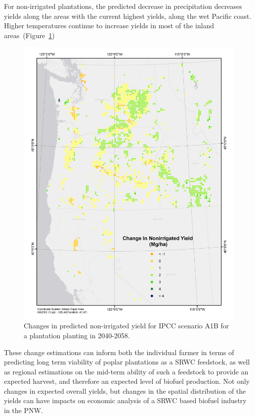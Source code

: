 \documentclass[preprint,review,12pt]{elsarticle}
\begin{document}
For non-irrigated plantations, the predicted decrease in precipitation
decreases yields along the areas with the current highest yields,
along the wet Pacific coast.  Higher temperatures continue to increase
yields in most of the inland areas~(Figure~\ref{fig:new_nonirrigated})

\begin{figure}[hp]
  \centering
  \includegraphics[width=1\linewidth]{climate_nonirrigated}
  \caption{Changes in predicted non-irrigated yield for \ac{IPCC} scenario A1B
    for a plantation planting in 2040-2058.}
  \label{fig:new_nonirrigated}
\end{figure}

These change estimations can inform both the individual farmer in terms of
predicting long term viability of poplar plantations as a \ac{SRWC}
feedstock, as well as regional estimations on the mid-term ability of
such a feedstock to provide an expected harvest, and therefore an
expected level of biofuel production.  Not only changes in expected
overall yields, but changes in the spatial distribution of the yields
can have impacts on economic analysis of a \ac{SRWC} based biofuel
industry in the \ac{PNW}.  
\end{document}
